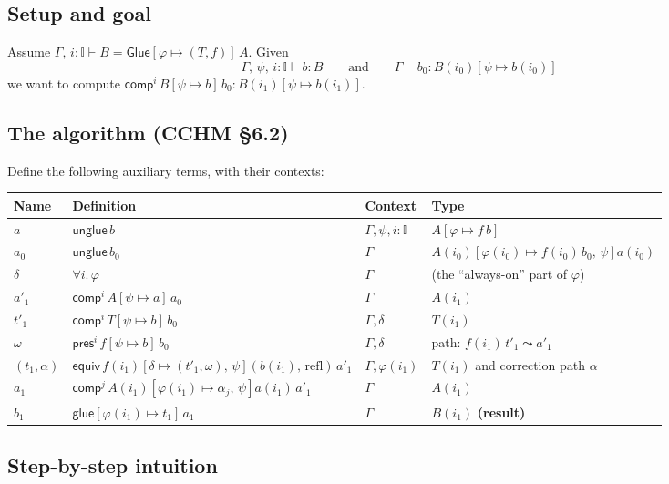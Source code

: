 \documentclass[11pt, a4paper]{article}
\newcommand{\III}{\mathbb{I}}
\newcommand{\pt}[1]{\mathsf{#1}}
\newcommand{\GlueT}{\pt{Glue}}
\newcommand{\glueT}{\pt{glue}}
\newcommand{\unglueT}{\pt{unglue}}
\newcommand{\compT}{\pt{comp}}
\newcommand{\equivT}{\pt{equiv}}
\newcommand{\pres}[1]{\pt{pres}^{#1}}
\newcommand{\sys}[2]{[#1 \mapsto #2]}
\newcommand{\io}{i_0}
\newcommand{\ii}{i_1}
\begin{document}
\subsection{Setup and goal}

Assume $\Gamma,\, i : \III \vdash B = \GlueT\sys{\varphi}{(T,f)}\,A$.
Given
\[
  \Gamma,\, \psi,\, i : \III \vdash b : B
  \qquad\text{and}\qquad
  \Gamma \vdash b_0 : B(\io)\sys{\psi}{b(\io)}
\]
we want to compute $\compT^i\, B\sys{\psi}{b}\, b_0 : B(\ii)\sys{\psi}{b(\ii)}$.

\subsection{The algorithm (CCHM \S6.2)}

Define the following auxiliary terms, with their contexts:

\medskip
\begin{center}
\renewcommand{\arraystretch}{1.5}
\begin{tabular}{@{}llll@{}}
\hline
\textbf{Name} & \textbf{Definition} & \textbf{Context} & \textbf{Type} \\
\hline
$a$ & $\unglueT\, b$ & $\Gamma,\psi,i:\III$
  & $A\sys{\varphi}{f\,b}$ \\
$a_0$ & $\unglueT\, b_0$ & $\Gamma$
  & $A(\io)\sys{\varphi(\io)}{f(\io)\,b_0,\,\psi}{a(\io)}$ \\
$\delta$ & $\forall i.\,\varphi$ & $\Gamma$
  & (the ``always-on'' part of $\varphi$) \\
$a'_1$ & $\compT^i\, A\sys{\psi}{a}\, a_0$ & $\Gamma$
  & $A(\ii)$ \\
$t'_1$ & $\compT^i\, T\sys{\psi}{b}\, b_0$ & $\Gamma,\delta$
  & $T(\ii)$ \\
$\omega$ & $\pres{i}\, f\sys{\psi}{b}\, b_0$ & $\Gamma,\delta$
  & path: $f(\ii)\,t'_1 \leadsto a'_1$ \\
$(t_1,\alpha)$ & $\equivT\, f(\ii)
  \sys{\delta}{(t'_1,\omega),\,\psi}{(b(\ii),\,\mathrm{refl})}\, a'_1$
  & $\Gamma,\varphi(\ii)$
  & $T(\ii)$ and correction path $\alpha$ \\
$a_1$ & $\compT^j\, A(\ii)
  \sys{\varphi(\ii)}{\alpha_j,\,\psi}{a(\ii)}\, a'_1$
  & $\Gamma$ & $A(\ii)$ \\
$b_1$ & $\glueT\sys{\varphi(\ii)}{t_1}\, a_1$ & $\Gamma$
  & $B(\ii)$ \quad \textbf{(result)} \\
\hline
\end{tabular}
\end{center}

\subsection{Step-by-step intuition}
\end{document}
